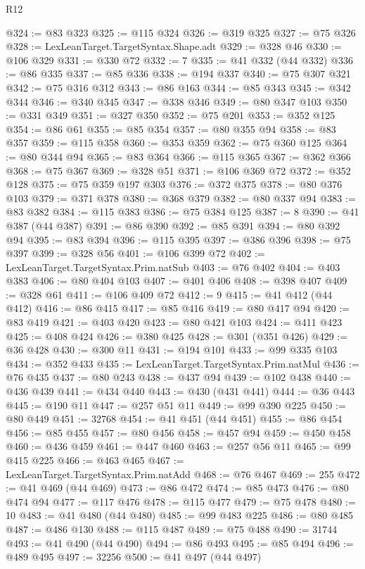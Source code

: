 \begin{lexlean}{R12}
\begin{coremodule}
@324 := @83 @323
@325 := @115 @324
@326 := @319 @325
@327 := @75 @326
@328 := LexLeanTarget.TargetSyntax.Shape.adt
@329 := @328 @46
@330 := @106 @329
@331 := @330 @72
@332 := 7
@335 := @41 @332 (@44 @332)
@336 := @86 @335
@337 := @85 @336
@338 := @194 @337
@340 := @75 @307 @321
@342 := @75 @316 @312
@343 := @86 @163
@344 := @85 @343
@345 := @342 @344
@346 := @340 @345
@347 := @338 @346
@349 := @80 @347 @103
@350 := @331 @349
@351 := @327 @350
@352 := @75 @201
@353 := @352 @125
@354 := @86 @61
@355 := @85 @354
@357 := @80 @355 @94
@358 := @83 @357
@359 := @115 @358
@360 := @353 @359
@362 := @75 @360 @125
@364 := @80 @344 @94
@365 := @83 @364
@366 := @115 @365
@367 := @362 @366
@368 := @75 @367
@369 := @328 @51
@371 := @106 @369 @72
@372 := @352 @128
@375 := @75 @359 @197 @303
@376 := @372 @375
@378 := @80 @376 @103
@379 := @371 @378
@380 := @368 @379
@382 := @80 @337 @94
@383 := @83 @382
@384 := @115 @383
@386 := @75 @384 @125
@387 := 8
@390 := @41 @387 (@44 @387)
@391 := @86 @390
@392 := @85 @391
@394 := @80 @392 @94
@395 := @83 @394
@396 := @115 @395
@397 := @386 @396
@398 := @75 @397
@399 := @328 @56
@401 := @106 @399 @72
@402 := LexLeanTarget.TargetSyntax.Prim.natSub
@403 := @76 @402
@404 := @403 @383
@406 := @80 @404 @103
@407 := @401 @406
@408 := @398 @407
@409 := @328 @61
@411 := @106 @409 @72
@412 := 9
@415 := @41 @412 (@44 @412)
@416 := @86 @415
@417 := @85 @416
@419 := @80 @417 @94
@420 := @83 @419
@421 := @403 @420
@423 := @80 @421 @103
@424 := @411 @423
@425 := @408 @424
@426 := @380 @425
@428 := @301 (@351 @426)
@429 := @36 @428
@430 := @300 @11
@431 := @194 @101
@433 := @99 @335 @103
@434 := @352 @433
@435 := LexLeanTarget.TargetSyntax.Prim.natMul
@436 := @76 @435
@437 := @80 @243
@438 := @437 @94
@439 := @102 @438
@440 := @436 @439
@441 := @434 @440
@443 := @430 (@431 @441)
@444 := @36 @443
@445 := @190 @11
@447 := @257 @51 @11
@449 := @99 @390 @225
@450 := @80 @449
@451 := 32768
@454 := @41 @451 (@44 @451)
@455 := @86 @454
@456 := @85 @455
@457 := @80 @456
@458 := @457 @94
@459 := @450 @458
@460 := @436 @459
@461 := @447 @460
@463 := @257 @56 @11
@465 := @99 @415 @225
@466 := @463 @465
@467 := LexLeanTarget.TargetSyntax.Prim.natAdd
@468 := @76 @467
@469 := 255
@472 := @41 @469 (@44 @469)
@473 := @86 @472
@474 := @85 @473
@476 := @80 @474 @94
@477 := @117 @476
@478 := @115 @477
@479 := @75 @478
@480 := 10
@483 := @41 @480 (@44 @480)
@485 := @99 @483 @225
@486 := @80 @485
@487 := @486 @130
@488 := @115 @487
@489 := @75 @488
@490 := 31744
@493 := @41 @490 (@44 @490)
@494 := @86 @493
@495 := @85 @494
@496 := @489 @495
@497 := 32256
@500 := @41 @497 (@44 @497)

\end{coremodule}
\end{lexlean}
